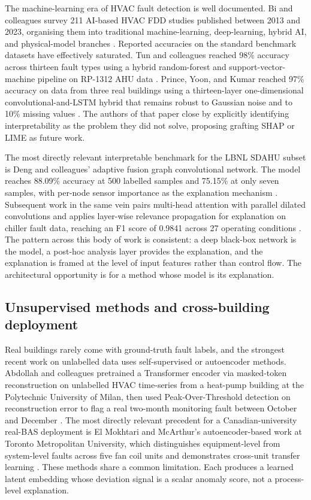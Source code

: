\documentclass[11pt,letterpaper]{article}
\begin{document}
The machine-learning era of HVAC fault detection is well documented. Bi and colleagues survey 211 AI-based HVAC FDD studies published between 2013 and 2023, organising them into traditional machine-learning, deep-learning, hybrid AI, and physical-model branches \cite{bi2024aihvacreview}. Reported accuracies on the standard benchmark datasets have effectively saturated. Tun and colleagues reached 98\% accuracy across thirteen fault types using a hybrid random-forest and support-vector-machine pipeline on RP-1312 AHU data \cite{tun2021hybridrfsvm}. Prince, Yoon, and Kumar reached 97\% accuracy on data from three real buildings using a thirteen-layer one-dimensional convolutional-and-LSTM hybrid that remains robust to Gaussian noise and to 10\% missing values \cite{prince2025improved1dcnnlstm}. The authors of that paper close by explicitly identifying interpretability as the problem they did not solve, proposing grafting SHAP or LIME as future work.

The most directly relevant interpretable benchmark for the LBNL SDAHU subset is Deng and colleagues' adaptive fusion graph convolutional network. The model reaches 88.09\% accuracy at 500 labelled samples and 75.15\% at only seven samples, with per-node sensor importance as the explanation mechanism \cite{deng2024afgcn}. Subsequent work in the same vein pairs multi-head attention with parallel dilated convolutions and applies layer-wise relevance propagation for explanation on chiller fault data, reaching an F1 score of 0.9841 across 27 operating conditions \cite{wang2025xmhac}. The pattern across this body of work is consistent: a deep black-box network is the model, a post-hoc analysis layer provides the explanation, and the explanation is framed at the level of input features rather than control flow. The architectural opportunity is for a method whose model is its explanation.

\subsection{Unsupervised methods and cross-building deployment}

Real buildings rarely come with ground-truth fault labels, and the strongest recent work on unlabelled data uses self-supervised or autoencoder methods. Abdollah and colleagues pretrained a Transformer encoder via masked-token reconstruction on unlabelled HVAC time-series from a heat-pump building at the Polytechnic University of Milan, then used Peak-Over-Threshold detection on reconstruction error to flag a real two-month monitoring fault between October and December \cite{abdollah2024transformerssl}. The most directly relevant precedent for a Canadian-university real-BAS deployment is El Mokhtari and McArthur's autoencoder-based work at Toronto Metropolitan University, which distinguishes equipment-level from system-level faults across five fan coil units and demonstrates cross-unit transfer learning \cite{elmokhtari2024aebas}. These methods share a common limitation. Each produces a learned latent embedding whose deviation signal is a scalar anomaly score, not a process-level explanation.
\end{document}
